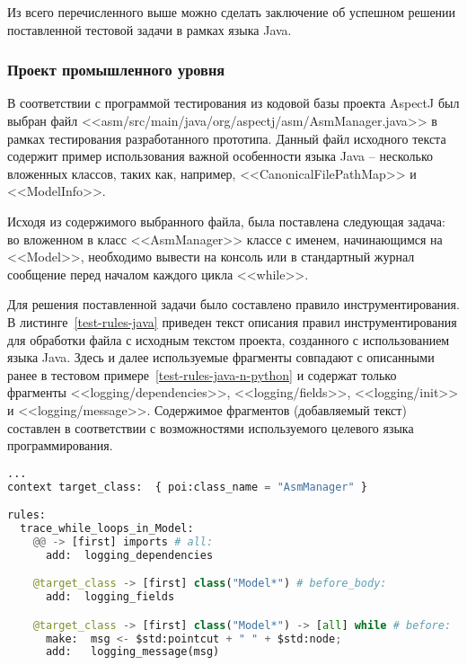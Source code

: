 Из всего перечисленного выше можно сделать заключение об успешном решении поставленной тестовой задачи в рамках языка Java.

\subsubsection{Проект промышленного уровня}

В соответствии с программой тестирования из кодовой базы проекта AspectJ был выбран файл <<asm/src/main/java/org/aspectj/asm/AsmManager.java>> в рамках тестирования разработанного прототипа.
Данный файл исходного текста содержит пример использования важной особенности языка Java -- несколько вложенных классов, таких как, например, <<CanonicalFilePathMap>> и <<ModelInfo>>.

Исходя из содержимого выбранного файла, была поставлена следующая задача:
во вложенном в класс <<AsmManager>> классе с именем, начинающимся на <<Model>>, необходимо вывести на консоль или в стандартный журнал сообщение перед началом каждого цикла <<while>>.

Для решения поставленной задачи было составлено правило инструментирования.
В листинге~\ref{test-rules-java} приведен текст описания правил инструментирования для обработки файла с исходным текстом проекта, созданного с использованием языка Java.
Здесь и далее используемые фрагменты совпадают с описанными ранее в тестовом примере~\ref{test-rules-java-n-python} и содержат только фрагменты <<logging/dependencies>>, <<logging/fields>>, <<logging/init>> и <<logging/message>>.
Содержимое фрагментов (добавляемый текст) составлен в соответствии с возможностями используемого целевого языка программирования.

\begin{lstlisting}[frame=single, language=Python, label={test-rules-java}, caption={Описание правил инструментирования. Java-проект.}]
...
context target_class:  { poi:class_name = "AsmManager" }

rules:
  trace_while_loops_in_Model:
    @@ -> [first] imports # all:
      add:  logging_dependencies

    @target_class -> [first] class("Model*") # before_body:
      add:  logging_fields

    @target_class -> [first] class("Model*") -> [all] while # before:
      make:  msg <- $std:pointcut + " " + $std:node;
      add:   logging_message(msg)
\end{lstlisting}

